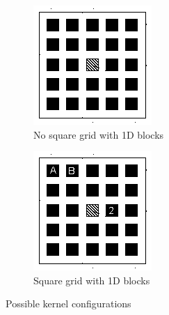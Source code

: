 \documentclass[a4paper]{article}
\begin{document}
\begin{figure}[!ht]
\begin{subfigure}{0.5\textwidth}
\centering
\includegraphics[width=\linewidth]{filter}
\caption{No square grid with 1D blocks}
\label{fig:f1}
\end{subfigure} %
\begin{subfigure}{0.5\textwidth}
\centering
\includegraphics[width=\linewidth]{filter_letters}
\caption{Square grid with 1D blocks}
\label{fig:f2}
\end{subfigure}
\caption{Possible kernel configurations}
 \label{fig:speed}
\end{figure}
\FloatBarrier
\end{document}
